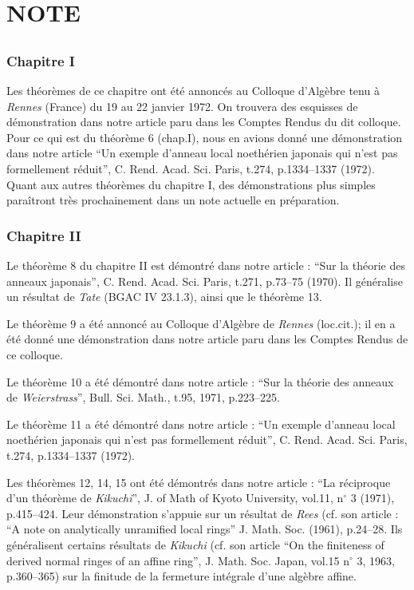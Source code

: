 {{%
\chapter*{NOTE}\thispagestyle{empty}
\label{sec:n1}
\section*{}

\subsection*{Chapitre I}

Les théorèmes de ce chapitre ont été annoncés au Colloque d’Algèbre tenu à \emph{Rennes} (France) du 19 au 22 janvier 1972. On trouvera des esquisses de démonstration dans notre article paru dans les Comptes Rendus du dit colloque. Pour ce qui est du théorème 6 (chap.I), nous en avions donné une démonstration dans notre article ``Un exemple d’anneau local noethérien japonais qui n’est pas formellement réduit'', C. Rend. Acad. Sci. Paris, t.274, p.1334--1337 (1972). Quant aux autres théorèmes du chapitre I, des démonstrations plus simples paraîtront très prochainement dans un note actuelle en préparation.

\subsection*{Chapitre II}

Le théorème 8 du chapitre II est démontré dans notre article : ``Sur la théorie des anneaux japonais'', C. Rend. Acad. Sci. Paris, t.271, p.73--75 (1970). Il généralise un résultat de \emph{Tate} (BGAC IV 23.1.3), ainsi que le théorème 13.

Le théorème 9 a été annoncé au Colloque d’Algèbre de \emph{Rennes} (loc.cit.); il en a été donné une démonstration dans notre article paru dans les Comptes Rendus de ce colloque.

Le théorème 10 a été démontré dans notre article : ``Sur la théorie des anneaux de \emph{Weierstrass}'', Bull. Sci. Math., t.95, 1971, p.223--225.

Le théorème 11 a été démontré dans notre article : ``Un exemple d’anneau local noethérien japonais qui n’est pas formellement réduit'', C. Rend. Acad. Sci. Paris, t.274, p.1334--1337 (1972).

Les théorèmes 12, 14, 15 ont été démontrés dans notre article : ``La réciproque d’un théorème de \emph{Kikuchi}'', J. of Math of Kyoto University, vol.11, n$^\circ$ 3 (1971), p.415--424. Leur démonstration s’appuie sur un résultat de \emph{Rees} (cf. son article : ``A note on analytically unramified local rings'' J. Math. Soc. (1961), p.24--28. Ils généralisent certains résultats de \emph{Kikuchi} (cf. son article ``On the finiteness of derived normal ringes of an affine ring'', J. Math. Soc. Japan, vol.15 n$^\circ$ 3, 1963, p.360--365) sur la finitude de la fermeture intégrale d’une algèbre affine.

}}
